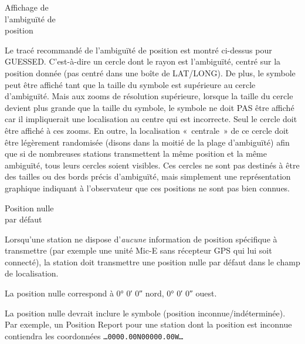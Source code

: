 \begin{aprssideblock}{Affichage de\\l'ambiguïté de\\position}
\label{affichage-de-lambiguuxe9-de-position}
Le tracé recommandé de l'ambiguïté de position est montré ci-dessus pour
GUESSED. C'est-à-dire un cercle dont le rayon est l'ambiguïté, centré
sur la position donnée (pas centré dans une boîte de LAT/LONG). De plus,
le symbole peut être affiché tant que la taille du symbole est
supérieure au cercle d'ambiguïté. Mais aux zooms de résolution
supérieure, lorsque la taille du cercle devient plus grande que la
taille du symbole, le symbole ne doit PAS être affiché car il
impliquerait une localisation au centre qui est incorrecte. Seul le
cercle doit être affiché à ces zooms. En outre, la localisation
«~centrale~» de ce cercle doit être légèrement randomisée (disons dans
la moitié de la plage d'ambiguïté) afin que si de nombreuses stations
transmettent la même position et la même ambiguïté, tous leurs cercles
soient visibles. Ces cercles ne sont pas destinés à être des tailles ou
des bords précis d'ambiguïté, mais simplement une représentation
graphique indiquant à l'observateur que ces positions ne sont pas bien
connues.
\end{aprssideblock}

\begin{aprssideblock}{Position nulle\\par défaut}
\label{position-nulle-par-duxe9faut}
Lorsqu'une station ne dispose d'\emph{aucune} information de position
spécifique à transmettre (par exemple une unité Mic-E sans récepteur GPS
qui lui soit connecté), la station doit transmettre une position nulle
par défaut dans le champ de localisation.

La position nulle correspond à 0° 0′ 0″ nord, 0° 0′ 0″ ouest.

La position nulle devrait inclure le symbole
 (position inconnue/indéterminée). Par exemple,
un Position Report pour une station dont la position est inconnue
contiendra les coordonnées
\texttt{…0000.00N}\lit{\textbackslash{}}\texttt{00000.00W}\texttt{…}
\end{aprssideblock}

